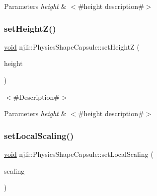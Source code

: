 \begin{DoxyParams}{Parameters}
{\em height} & $<$\#height description\#$>$ \\
\hline
\end{DoxyParams}
\mbox{\label{classnjli_1_1_physics_shape_capsule_a076f5e3be196237e9854d9ae2ceadfe5}} 
\subsubsection{\texorpdfstring{set\+Height\+Z()}{setHeightZ()}}
{\footnotesize\ttfamily \mbox{\hyperlink{_thread_8h_af1e856da2e658414cb2456cb6f7ebc66}{void}} njli\+::\+Physics\+Shape\+Capsule\+::set\+HeightZ (\begin{DoxyParamCaption}\item[{\mbox{\hyperlink{_util_8h_a5f6906312a689f27d70e9d086649d3fd}{f32}}}]{height }\end{DoxyParamCaption})}

$<$\#\+Description\#$>$


\begin{DoxyParams}{Parameters}
{\em height} & $<$\#height description\#$>$ \\
\hline
\end{DoxyParams}
\mbox{\label{classnjli_1_1_physics_shape_capsule_aced243d46142c8680d87e2cf4fbfc5f7}} 
\subsubsection{\texorpdfstring{set\+Local\+Scaling()}{setLocalScaling()}}
{\footnotesize\ttfamily \mbox{\hyperlink{_thread_8h_af1e856da2e658414cb2456cb6f7ebc66}{void}} njli\+::\+Physics\+Shape\+Capsule\+::set\+Local\+Scaling (\begin{DoxyParamCaption}\item[{const bt\+Vector3 \&}]{scaling }\end{DoxyParamCaption})\hspace{0.3cm}{\ttfamily [virtual]}}


